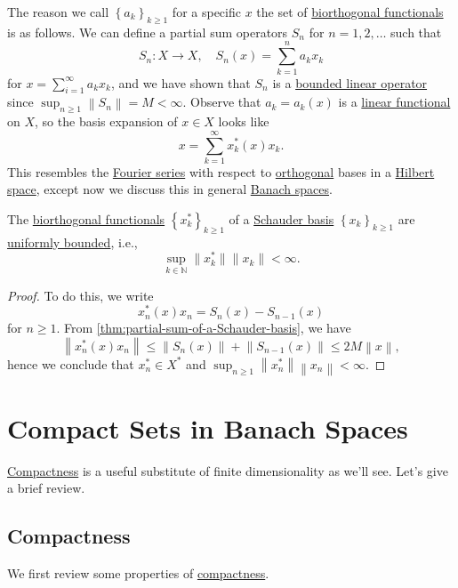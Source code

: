 The reason we call \(\left\{ a_k \right\} _{k\geq 1}\) for a specific \(x\) the set of \hyperref[def:biorthogonal-functional]{biorthogonal functionals} is as follows. We can define a partial sum operators \(S_n\) for \(n = 1, 2, \dots  \) such that
\[
	S_n\colon X\to X,\quad S_n (x) = \sum\limits_{k=1}^{n} a_k x_k
\]
for \(x = \sum_{i=1}^{\infty }a_k x_k\), and we have shown that \(S_n\) is a \hyperref[def:bounded-linear-op]{bounded linear operator} since \(\sup _{n\geq 1} \left\lVert S_n\right\rVert = M < \infty \). Observe that \(a_k = a_k(x)\) is a \hyperref[def:linear-functional]{linear functional} on \(X\), so the basis expansion of \(x\in X\) looks like
\[
	x = \sum_{k=1}^{\infty} x^{\ast} _k(x) x_k.
\]
This resembles the \hyperref[def:Fourier-series]{Fourier series} with respect to \hyperref[def:orthogonal-system]{orthogonal} bases in a \hyperref[def:Hilbert-space]{Hilbert space}, except now we discuss this in general \hyperref[def:Banach-space]{Banach spaces}.

\begin{proposition}
	The \hyperref[def:biorthogonal-functional]{biorthogonal functionals} \(\left\{ x_k^{\ast} \right\} _{k\geq 1}\) of a \hyperref[def:Schauder-basis]{Schauder basis} \(\left\{ x_k \right\} _{k\geq 1}\) are \hyperref[def:uniformly-bounded]{uniformly bounded}, i.e.,
	\[
		\sup _{k\in \mathbb{N} }\lVert x_k ^{\ast}  \rVert \lVert x_{k}  \rVert < \infty .
	\]
\end{proposition}
\begin{proof}
	To do this, we write
	\[
		x_n^{\ast} (x) x_n = S_n(x) - S_{n-1}(x)
	\]
	for \(n \geq 1\). From \autoref{thm:partial-sum-of-a-Schauder-basis}, we have
	\[
		\left\lVert x^{\ast} _n(x)x_n\right\rVert \leq \left\lVert S_n(x)\right\rVert + \left\lVert S_{n-1}(x) \right\rVert \leq 2M \left\lVert x\right\rVert,
	\]
	hence we conclude that \(x_n^{\ast} \in X^{\ast} \) and \(\sup _{n\geq 1} \left\lVert x_n^{\ast} \right\rVert \left\lVert x_n\right\rVert < \infty \).
\end{proof}

\section{Compact Sets in Banach Spaces}
\hyperref[def:compact]{Compactness} is a useful substitute of finite dimensionality as we'll see. Let's give a brief review.
\subsection{Compactness}
We first review some properties of \hyperref[def:compact]{compactness}.

